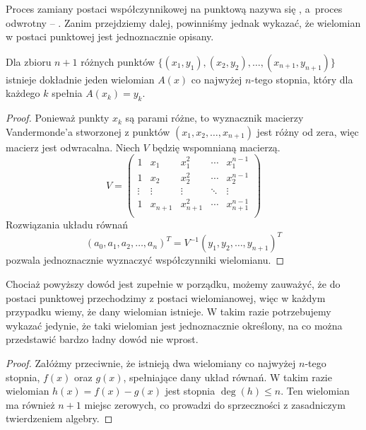 \documentclass[11pt]{scrartcl}
\begin{document}
    Proces zamiany postaci współczynnikowej na punktową nazywa się , a~proces odwrotny -- . Zanim przejdziemy dalej, powinniśmy jednak wykazać, że wielomian w postaci punktowej jest jednoznacznie opisany.
    \begin{theorem}
        \label{t:polynomial_interpolation}
        Dla zbioru $n + 1$ różnych punktów $\{(x_1, y_1), (x_2, y_2), \ldots, (x_{n+1}, y_{n+1})\}$ istnieje dokładnie jeden wielomian $A(x)$ co najwyżej $n$-tego stopnia, który dla każdego $k$ spełnia $A(x_k) = y_k$.
    \end{theorem}
    \begin{proof}
        Ponieważ punkty $x_k$ są parami różne, to wyznacznik macierzy Vandermonde'a stworzonej z punktów $(x_1, x_2, \ldots, x_{n+1})$ jest różny od zera, więc macierz jest odwracalna. Niech $V$ będzię wspomnianą macierzą.
        $$ V = \begin{pmatrix}
            1 & x_1 & x_1^2  & \cdots & x_1^{n-1} \\
            1 & x_2 & x_2^2  & \cdots & x_2^{n-1} \\
            \vdots & \vdots  & \vdots & \ddots & \vdots    \\
            1 & x_{n+1} & x_{n+1}^2  & \cdots & x_{n+1}^{n-1} \\
        \end{pmatrix} $$
        Rozwiązania układu równań
        $$ (a_0, a_1, a_2, \ldots, a_n)^T = V^{-1}(y_1, y_2, \ldots, y_{n+1})^T $$
        pozwala jednoznacznie wyznaczyć współczynniki wielomianu.
    \end{proof}

    Chociaż powyższy dowód jest zupełnie w porządku, możemy zauważyć, że do postaci punktowej przechodzimy z postaci wielomianowej, więc w każdym przypadku wiemy, że dany wielomian istnieje. W takim razie potrzebujemy wykazać jedynie, że taki wielomian jest jednoznacznie określony, na co można przedstawić bardzo ładny dowód nie wprost.

    \begin{proof}
        Załóżmy przeciwnie, że istnieją dwa wielomiany co najwyżej $n$-tego stopnia, $f(x)$ oraz $g(x)$, spełniające dany układ równań. W takim razie wielomian $h(x) = f(x) - g(x)$ jest stopnia $\deg(h) \leq n$. Ten wielomian ma również $n + 1$ miejsc zerowych, co prowadzi do sprzeczności z zasadniczym twierdzeniem algebry.
    \end{proof}
\end{document}
